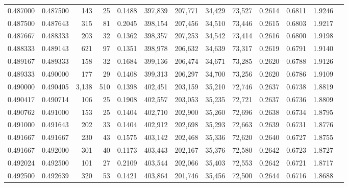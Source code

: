 \begin{tabular}{rrrrrrrrrrrrr}
0.487000 & 0.487500 &   143 &  25 &                                     0.1488 & 397,839 & 207,771 &  34,429 &  73,527 & 0.2614 & 0.6811 & 1.9246 \\
0.487500 & 0.487643 &   315 &  81 &                                     0.2045 & 398,154 & 207,456 &  34,510 &  73,446 & 0.2615 & 0.6803 & 1.9217 \\
0.487667 & 0.488333 &   203 &  32 &                                     0.1362 & 398,357 & 207,253 &  34,542 &  73,414 & 0.2616 & 0.6800 & 1.9198 \\
0.488333 & 0.489143 &   621 &  97 &                                     0.1351 & 398,978 & 206,632 &  34,639 &  73,317 & 0.2619 & 0.6791 & 1.9140 \\
0.489167 & 0.489333 &   158 &  32 &                                     0.1684 & 399,136 & 206,474 &  34,671 &  73,285 & 0.2620 & 0.6788 & 1.9126 \\
0.489333 & 0.490000 &   177 &  29 &                                     0.1408 & 399,313 & 206,297 &  34,700 &  73,256 & 0.2620 & 0.6786 & 1.9109 \\
0.490000 & 0.490405 & 3,138 & 510 &                                     0.1398 & 402,451 & 203,159 &  35,210 &  72,746 & 0.2637 & 0.6738 & 1.8819 \\
0.490417 & 0.490714 &   106 &  25 &                                     0.1908 & 402,557 & 203,053 &  35,235 &  72,721 & 0.2637 & 0.6736 & 1.8809 \\
0.490762 & 0.491000 &   153 &  25 &                                     0.1404 & 402,710 & 202,900 &  35,260 &  72,696 & 0.2638 & 0.6734 & 1.8795 \\
0.491000 & 0.491643 &   202 &  33 &                                     0.1404 & 402,912 & 202,698 &  35,293 &  72,663 & 0.2639 & 0.6731 & 1.8776 \\
0.491667 & 0.491667 &   230 &  43 &                                     0.1575 & 403,142 & 202,468 &  35,336 &  72,620 & 0.2640 & 0.6727 & 1.8755 \\
0.491667 & 0.492000 &   301 &  40 &                                     0.1173 & 403,443 & 202,167 &  35,376 &  72,580 & 0.2642 & 0.6723 & 1.8727 \\
0.492024 & 0.492500 &   101 &  27 &                                     0.2109 & 403,544 & 202,066 &  35,403 &  72,553 & 0.2642 & 0.6721 & 1.8717 \\
0.492500 & 0.492639 &   320 &  53 &                                     0.1421 & 403,864 & 201,746 &  35,456 &  72,500 & 0.2644 & 0.6716 & 1.8688 \\

\end{tabular}
